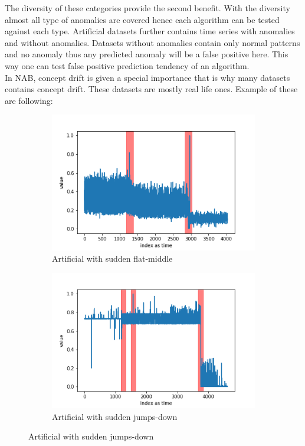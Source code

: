 \documentclass[12pt]{article}
\begin{document}
\break
The diversity of these categories provide the second benefit. With the diversity almost all type of anomalies are covered hence each algorithm can be tested against each type. Artificial datasets further contains time series with anomalies and without anomalies. Datasets without anomalies contain only normal patterns and no anomaly thus any predicted anomaly will be a false positive here. This way one can test false positive prediction tendency of an algorithm. \\
\break
In NAB, concept drift is given a special importance that is why many datasets contains concept drift. These datasets are mostly real life ones. Example of these are following:

\begin{figure}[H]
  \begin{subfigure}[t]{.5\textwidth}
    \centering
    \includegraphics[width=\linewidth]{images/dataAnomalies/aws/ec2_cpu_utilization_5f5533.png}
    \caption{Artificial with sudden flat-middle}
  \end{subfigure}
  \hfill
  \begin{subfigure}[t]{.5\textwidth}
    \centering
    \includegraphics[width=\linewidth]{images/dataAnomalies/aws/grok_asg_anomaly.png}
    \caption{Artificial with sudden jumps-down}
  \end{subfigure}


\end{figure}
\end{document}
